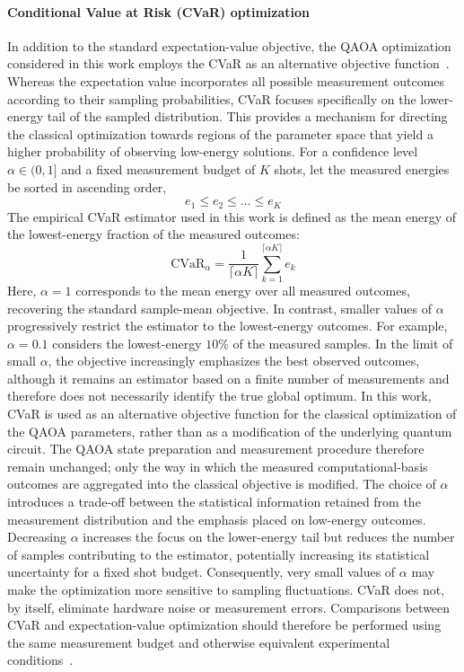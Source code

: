 \paragraph{Conditional Value at Risk (CVaR) optimization}
In addition to the standard expectation-value objective, the QAOA optimization considered in this work employs the CVaR as an alternative objective function~\cite{cvar_1}. Whereas the expectation value incorporates all possible measurement outcomes according to their sampling probabilities, CVaR focuses specifically on the lower-energy tail of the sampled distribution. This provides a mechanism for directing the classical optimization towards regions of the parameter space that yield a higher probability of observing low-energy solutions.
For a confidence level $\alpha\in(0,1]$ and a fixed measurement budget of $K$ shots, let the measured energies be sorted in ascending order,
\begin{equation}
e_1 \leq e_2 \leq \dots \leq e_K
\end{equation}
The empirical CVaR estimator used in this work is defined as the mean energy of the lowest-energy fraction of the measured outcomes:
\begin{equation}
\mathrm{CVaR}_{\alpha} = \frac{1}{\lceil\alpha K\rceil}
\sum_{k=1}^{\lceil\alpha K\rceil} e_k
\end{equation}
Here, $\alpha=1$ corresponds to the mean energy over all measured outcomes, recovering the standard sample-mean objective. In contrast, smaller values of $\alpha$ progressively restrict the estimator to the lowest-energy outcomes. For example, $\alpha=0.1$ considers the lowest-energy $10\%$ of the measured samples. In the limit of small $\alpha$, the objective increasingly emphasizes the best observed outcomes, although it remains an estimator based on a finite number of measurements and therefore does not necessarily identify the true global optimum.
In this work, CVaR is used as an alternative objective function for the classical optimization of the QAOA parameters, rather than as a modification of the underlying quantum circuit. The QAOA state preparation and measurement procedure therefore remain unchanged; only the way in which the measured computational-basis outcomes are aggregated into the classical objective is modified.
The choice of $\alpha$ introduces a trade-off between the statistical information retained from the measurement distribution and the emphasis placed on low-energy outcomes. Decreasing $\alpha$ increases the focus on the lower-energy tail but reduces the number of samples contributing to the estimator, potentially increasing its statistical uncertainty for a fixed shot budget. Consequently, very small values of $\alpha$ may make the optimization more sensitive to sampling fluctuations. CVaR does not, by itself, eliminate hardware noise or measurement errors. Comparisons between CVaR and expectation-value optimization should therefore be performed using the same measurement budget and otherwise equivalent experimental conditions~\cite{cvar_1,cvar_2}.

